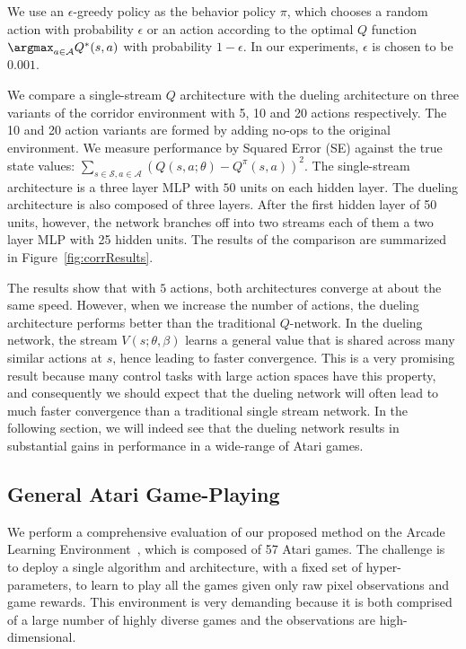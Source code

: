 We use an $\epsilon$-greedy policy as the behavior policy $\pi$, which chooses a random action with probability $\epsilon$ or an action according to the optimal $Q$ function
$\argmax_{a \in \cal{A}}Q^*(s,a)$ with probability $1-\epsilon$. In our experiments, $\epsilon$ is chosen to be $0.001$.

We compare a single-stream $Q$ architecture with the dueling architecture
on three variants of the corridor environment with 5, 10 and 20 actions 
respectively. The 10 and 20 action variants are formed by adding no-ops 
to the original environment.
We measure performance by Squared Error (SE) against the 
true state values: $\sum_{s \in \mathcal{S}, a \in \mathcal{A}} ( Q(s,a;\theta) - Q^{\pi}(s, a) )^2$.
The single-stream architecture is a three layer MLP with $50$ units
on each hidden layer. 
The dueling architecture is also composed of three layers.
After the first hidden layer of 50 units, however, the network branches
off into two streams each of them a two layer MLP with 25 hidden units.
The results of the comparison are summarized in Figure~\ref{fig:corrResults}.

The results show that with $5$ actions, both architectures converge at about the same speed.
However, when we increase the number of actions, the dueling
architecture performs better than the traditional $Q$-network. In the dueling network,
the stream ${V}(s;\theta,\beta)$ learns a
general value that is shared across many similar actions at $s$, hence leading to faster convergence. This is a very promising result because many control tasks with large action spaces have this property, and consequently we should expect that the dueling network will often lead to much faster convergence than a traditional single stream network. In the following section, we will indeed see that the dueling network results in substantial gains in performance in a wide-range of Atari games.



\subsection{General Atari Game-Playing}

We perform a comprehensive evaluation of our proposed method on the Arcade Learning Environment~\cite{Bellemare:2013},
which is composed of 57 Atari games. The challenge is to deploy a single algorithm and architecture,
with a fixed set of hyper-parameters, to learn to play all the games
given only raw pixel observations and game rewards. 
This environment is very demanding because it is both comprised of a large number of highly diverse games and the observations are high-dimensional.

